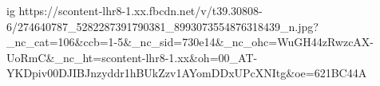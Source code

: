  
 
 
 
 

\ifcmt
  ig https://scontent-lhr8-1.xx.fbcdn.net/v/t39.30808-6/274640787_5282287391790381_8993073554876318439_n.jpg?_nc_cat=106&ccb=1-5&_nc_sid=730e14&_nc_ohc=WuGH44zRwzcAX-UoRmC&_nc_ht=scontent-lhr8-1.xx&oh=00_AT-YKDpiv00DJIBJnzyddr1hBUkZzv1AYomDDxUPcXNItg&oe=621BC44A
\fi
